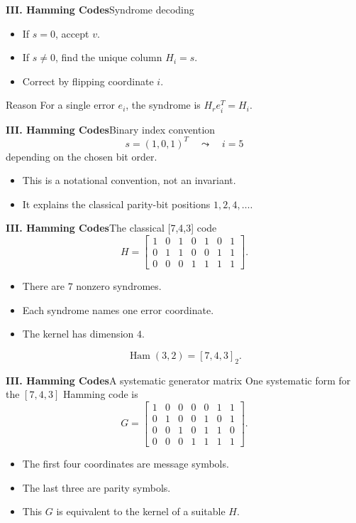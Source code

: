 \begin{frame}{\textbf{III. Hamming Codes}}{Syndrome decoding}
\small
{}
\begin{itemize}
  \item If $s=0$, accept $v$.
  \item If $s\ne0$, find the unique column $H_i=s$.
  \item Correct by flipping coordinate $i$.
\end{itemize}
\begin{block}{Reason}
For a single error $e_i$, the syndrome is $H_re_i^T=H_i$.
\end{block}
\end{frame}

\begin{frame}{\textbf{III. Hamming Codes}}{Binary index convention}
\small
{}
\[
  s=(1,0,1)^T\quad\leadsto\quad i=5
\]
depending on the chosen bit order.
\begin{itemize}
  \item This is a notational convention, not an invariant.
  \item It explains the classical parity-bit positions $1,2,4,\ldots$.
\end{itemize}
\end{frame}

\begin{frame}{\textbf{III. Hamming Codes}}{The classical [7,4,3] code}
\small
\[
H=
\begin{bmatrix}
1&0&1&0&1&0&1\\
0&1&1&0&0&1&1\\
0&0&0&1&1&1&1
\end{bmatrix}.
\]
\begin{itemize}
  \item There are $7$ nonzero syndromes.
  \item Each syndrome names one error coordinate.
  \item The kernel has dimension $4$.
\end{itemize}
\[
  \operatorname{Ham}(3,2)=[7,4,3]_2.
\]
\end{frame}

\begin{frame}{\textbf{III. Hamming Codes}}{A systematic generator matrix}
\small
One systematic form for the $[7,4,3]$ Hamming code is
\[
G=
\begin{bmatrix}
1&0&0&0&0&1&1\\
0&1&0&0&1&0&1\\
0&0&1&0&1&1&0\\
0&0&0&1&1&1&1
\end{bmatrix}.
\]
\begin{itemize}
  \item The first four coordinates are message symbols.
  \item The last three are parity symbols.
  \item This $G$ is equivalent to the kernel of a suitable $H$.
\end{itemize}
\end{frame}

